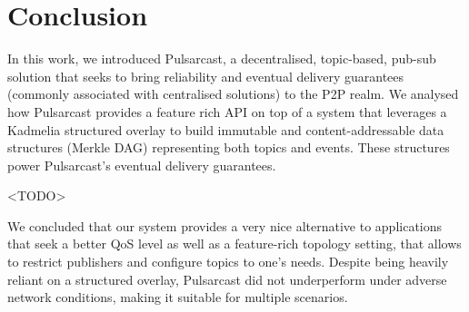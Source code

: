 
\section{Conclusion}
\label{section:conclusion}

In this work, we introduced Pulsarcast, a decentralised, topic-based, pub-sub
solution that seeks to bring reliability and eventual delivery guarantees
(commonly associated with centralised solutions) to the P2P realm. We analysed
how Pulsarcast provides a feature rich API on top of a system that leverages a
Kadmelia structured overlay to build immutable and content-addressable data
structures (Merkle DAG) representing both topics and events. These structures
power Pulsarcast's eventual delivery guarantees.

<TODO>

We concluded that our system provides a very nice alternative to applications
that seek a better QoS level as well as a feature-rich topology setting, that
allows to restrict publishers and configure topics to one's needs. Despite
being heavily reliant on a structured overlay, Pulsarcast did not underperform
under adverse network conditions, making it suitable for multiple scenarios. 
